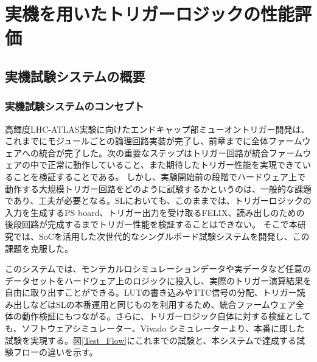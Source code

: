 \chapter{実機を用いたトリガーロジックの性能評価}
\label{chap_TriggerTest}

\section{実機試験システムの概要}
\subsection{実機試験システムのコンセプト}
高輝度LHC-ATLAS実験に向けたエンドキャップ部ミューオントリガー開発は、これまでにモジュールごとの論理回路実装が完了し、前章までに全体ファームウェアへの統合が完了した。次の重要なステップはトリガー回路が統合ファームウェアの中で正常に動作していること、また期待したトリガー性能を実現できていることを検証することである。
しかし、実験開始前の段階でハードウェア上で動作する大規模トリガー回路をどのように試験するかというのは、一般的な課題であり、工夫が必要となる。SLにおいても、このままでは、トリガーロジックの入力を生成するPS board、トリガー出力を受け取るFELIX、読み出しのための後段回路が完成するまでトリガー性能を検証することはできない。
そこで本研究では、SoCを活用した次世代的なシングルボード試験システムを開発し、この課題を克服した。


このシステムでは、モンテカルロシミュレーションデータや実データなど任意のデータセットをハードウェア上のロジックに投入し、実際のトリガー演算結果を自由に取り出すことができる。LUTの書き込みやTTC信号の分配、トリガー読み出しなどはSLの本番運用と同じものを利用するため、統合ファームウェア全体の動作検証にもつながる。さらに、トリガーロジック自体に対する検証としても、ソフトウェアシミュレーター、Vivado シミュレーターより、本番に即した試験を実現する。図\ref{Test_Flow}にこれまでの試験と、本システムで達成する試験フローの違いを示す。

